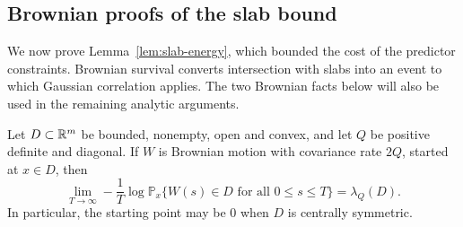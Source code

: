 \subsection{Brownian proofs of the slab bound}

We now prove Lemma~\ref{lem:slab-energy}, which bounded the cost of the
predictor constraints.  Brownian survival converts intersection with slabs
into an event to which Gaussian correlation applies.  The two Brownian
facts below will also be used in the remaining analytic arguments.

\begin{lemma}\label{lem:brownian-rate}
Let $D\subset\mathbb R^m$ be bounded, nonempty, open and convex, and let $Q$ be
positive definite and diagonal.  If $W$ is Brownian motion with covariance
rate $2Q$, started at $x\in D$, then
\begin{equation}\label{eq:brownian-rate}
 \lim_{T\to\infty}-\frac1T
 \log\mathbb P_x\{W(s)\in D\text{ for all }0\le s\le T\}
 =\lambda_Q(D).
\end{equation}
In particular, the starting point may be $0$ when $D$ is centrally
symmetric.
\end{lemma}

